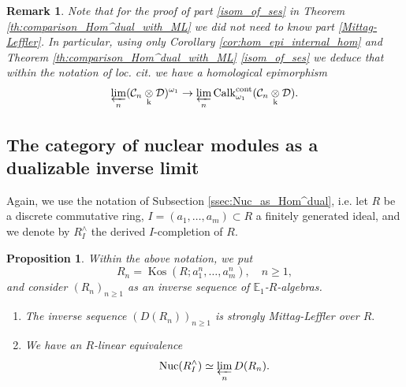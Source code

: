 \documentclass[11pt,leqno]{amsart}
\newtheorem{prop}[theo]{Proposition}
\newtheorem{remark}[theo]{Remark}
\numberwithin{equation}{section}
\newcommand{\tens}[1]{%
  \mathbin{\mathop{\otimes}\displaylimits_{#1}}%
}
\newcommand{\prolim}[1][]{\mathop{\varprojlim}\limits_{#1}}
\newcommand{\Nuc}{\operatorname{Nuc}}
\newcommand{\cont}{\operatorname{cont}}
\newcommand{\bE}{{\mathbb E}}
\newcommand{\mk}{\mathrm k}
\newcommand{\cD}{{\mathcal D}}
\newcommand{\cC}{{\mathcal C}}
\newcommand{\Kos}{\operatorname{Kos}}
\newcommand{\Calk}{\operatorname{Calk}}
\begin{document}
\begin{remark}\label{rem:avoiding_Mittag_Leffler}
Note that for the proof of part \ref{isom_of_ses} in Theorem \ref{th:comparison_Hom^dual_with_ML} we did not need to know part \ref{Mittag-Leffler}. In particular, using only Corollary \ref{cor:hom_epi_internal_hom} and Theorem \ref{th:comparison_Hom^dual_with_ML} \ref{isom_of_ses} we deduce that within the notation of loc. cit. we have a homological epimorphism
\begin{equation*}
\prolim[n](\cC_n\tens{\mk}\cD)^{\omega_1}\to \prolim[n]\Calk_{\omega_1}^{\cont}(\cC_n\tens{\mk}\cD).
\end{equation*}	
\end{remark}

\subsection{The category of nuclear modules as a dualizable inverse limit}

Again, we use the notation of Subsection \ref{ssec:Nuc_as_Hom^dual}, i.e. let $R$ be a discrete commutative ring, $I=(a_1,\dots,a_m)\subset R$ a finitely generated ideal, and we denote by $R^{\wedge}_I$ the derived $I$-completion of $R.$ 

\begin{prop}\label{prop:Nuc_as_limit}
Within the above notation, we put
\begin{equation*}
R_n=\Kos(R;a_1^n,\dots,a_m^n),\quad n\geq 1,
\end{equation*}
and consider $(R_n)_{n\geq 1}$ as an inverse sequence of $\bE_1$-$R$-algebras.
\begin{enumerate}[label=(\roman*),ref=(\roman*)]
\item The inverse sequence $(D(R_n))_{n\geq 1}$ is strongly Mittag-Leffler over $R.$ \label{Mittag_Leffler_derived_quotients}
\item We have an $R$-linear equivalence
\begin{equation*}
\Nuc(R^{\wedge}_I)\simeq\prolim[n]D(R_n).
\end{equation*} \label{Nuc as limit}
\end{enumerate}
\end{prop}
\end{document}
